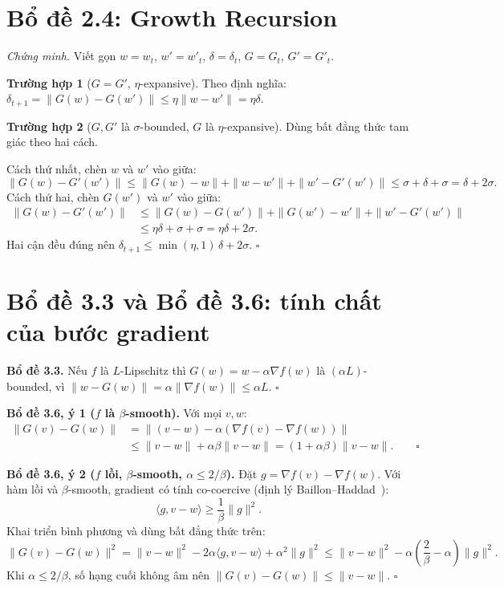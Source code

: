 \section{Bổ đề 2.4: Growth Recursion}

\textit{Chứng minh.} Viết gọn $w = w_t$, $w' = w'_t$, $\delta = \delta_t$, $G = G_t$, $G' = G'_t$.

\textbf{Trường hợp 1} ($G = G'$, $\eta$-expansive). Theo định nghĩa: $\delta_{t+1} = \|G(w) - G(w')\| \le \eta\|w - w'\| = \eta\delta$.

\textbf{Trường hợp 2} ($G, G'$ là $\sigma$-bounded, $G$ là $\eta$-expansive). Dùng bất đẳng thức tam giác theo hai cách.

Cách thứ nhất, chèn $w$ và $w'$ vào giữa:
\[
\|G(w) - G'(w')\| \le \|G(w) - w\| + \|w - w'\| + \|w' - G'(w')\| \le \sigma + \delta + \sigma = \delta + 2\sigma.
\]
Cách thứ hai, chèn $G(w')$ và $w'$ vào giữa:
\[
\begin{aligned}
\|G(w) - G'(w')\| &\le \|G(w) - G(w')\| + \|G(w') - w'\| + \|w' - G'(w')\| \\
&\le \eta\delta + \sigma + \sigma = \eta\delta + 2\sigma.
\end{aligned}
\]
Hai cận đều đúng nên $\delta_{t+1} \le \min(\eta, 1)\,\delta + 2\sigma$. $\square$

\section{Bổ đề 3.3 và Bổ đề 3.6: tính chất của bước gradient}

\textbf{Bổ đề 3.3.} Nếu $f$ là $L$-Lipschitz thì $G(w) = w - \alpha\nabla f(w)$ là $(\alpha L)$-bounded, vì $\|w - G(w)\| = \alpha\|\nabla f(w)\| \le \alpha L$. $\square$

\textbf{Bổ đề 3.6, ý 1 ($f$ là $\beta$-smooth).} Với mọi $v, w$:
\[
\begin{aligned}
\|G(v) - G(w)\| &= \|(v - w) - \alpha(\nabla f(v) - \nabla f(w))\| \\
&\le \|v - w\| + \alpha\beta\|v - w\| = (1 + \alpha\beta)\|v - w\|. \qquad \square
\end{aligned}
\]

\textbf{Bổ đề 3.6, ý 2 ($f$ lồi, $\beta$-smooth, $\alpha \le 2/\beta$).} Đặt $g = \nabla f(v) - \nabla f(w)$. Với hàm lồi và $\beta$-smooth, gradient có tính co-coercive (định lý Baillon--Haddad~\cite{nesterov2004introductory}):
\[
\langle g, v - w\rangle \ge \frac{1}{\beta}\|g\|^2.
\]
Khai triển bình phương và dùng bất đẳng thức trên:
\[
\|G(v) - G(w)\|^2 = \|v - w\|^2 - 2\alpha\langle g, v - w\rangle + \alpha^2\|g\|^2 \le \|v - w\|^2 - \alpha\left(\frac{2}{\beta} - \alpha\right)\|g\|^2.
\]
Khi $\alpha \le 2/\beta$, số hạng cuối không âm nên $\|G(v) - G(w)\| \le \|v - w\|$. $\square$

